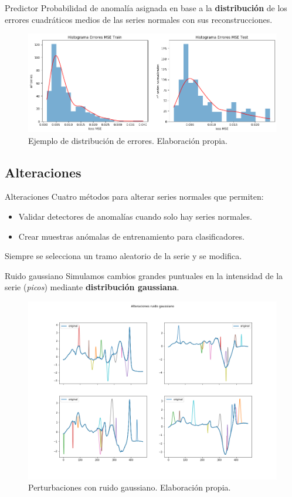 \documentclass[spanish]{beamer}
\begin{document}
\begin{frame}{Predictor}
  Probabilidad de anomalía asignada en base a la \textbf{distribución} de los errores cuadráticos medios de las series normales con sus reconstrucciones.

  \begin{figure}
    \centering
    \includegraphics[width=1\linewidth]{img/hists}
    \caption{Ejemplo de distribución de errores. Elaboración propia.}
  \end{figure}
\end{frame}

\subsection{Alteraciones}

\begin{frame}{Alteraciones}
  Cuatro métodos para alterar series normales que permiten:
  \begin{itemize}
    \item Validar detectores de anomalías cuando solo hay series normales.
    \item Crear muestras anómalas de entrenamiento para clasificadores.
  \end{itemize}
  \pause

  Siempre se selecciona un tramo aleatorio de la serie y se modifica.
\end{frame}

\begin{frame}{Ruido gaussiano}
  Simulamos cambios grandes puntuales en la intensidad de la serie (\emph{picos}) mediante \textbf{distribución gaussiana}.

  \begin{figure}
    \centering
    \includegraphics[width=.8\linewidth]{img/ruido-gauss}
    \caption{Perturbaciones con ruido gaussiano. Elaboración propia.}
  \end{figure}
\end{frame}
\end{document}
